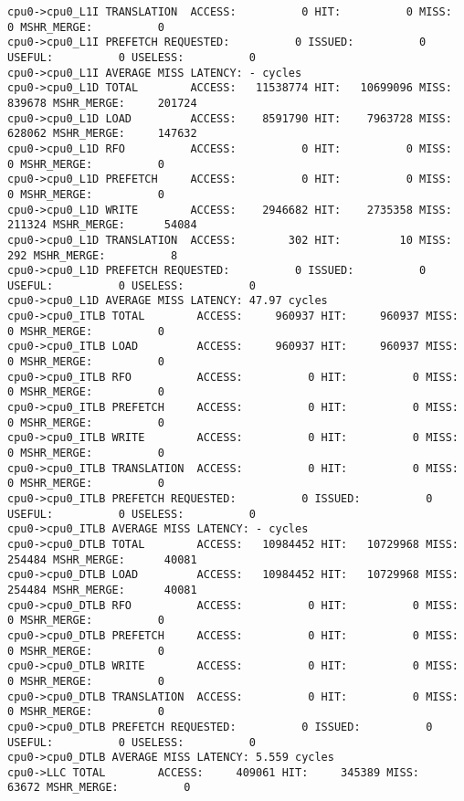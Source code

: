 \documentclass[17pt]{article}
\begin{document}
\begin{LTR}
\begin{lstlisting}[basicstyle=\tiny\ttfamily]
cpu0->cpu0_L1I TRANSLATION  ACCESS:          0 HIT:          0 MISS:          0 MSHR_MERGE:          0
cpu0->cpu0_L1I PREFETCH REQUESTED:          0 ISSUED:          0 USEFUL:          0 USELESS:          0
cpu0->cpu0_L1I AVERAGE MISS LATENCY: - cycles
cpu0->cpu0_L1D TOTAL        ACCESS:   11538774 HIT:   10699096 MISS:     839678 MSHR_MERGE:     201724
cpu0->cpu0_L1D LOAD         ACCESS:    8591790 HIT:    7963728 MISS:     628062 MSHR_MERGE:     147632
cpu0->cpu0_L1D RFO          ACCESS:          0 HIT:          0 MISS:          0 MSHR_MERGE:          0
cpu0->cpu0_L1D PREFETCH     ACCESS:          0 HIT:          0 MISS:          0 MSHR_MERGE:          0
cpu0->cpu0_L1D WRITE        ACCESS:    2946682 HIT:    2735358 MISS:     211324 MSHR_MERGE:      54084
cpu0->cpu0_L1D TRANSLATION  ACCESS:        302 HIT:         10 MISS:        292 MSHR_MERGE:          8
cpu0->cpu0_L1D PREFETCH REQUESTED:          0 ISSUED:          0 USEFUL:          0 USELESS:          0
cpu0->cpu0_L1D AVERAGE MISS LATENCY: 47.97 cycles
cpu0->cpu0_ITLB TOTAL        ACCESS:     960937 HIT:     960937 MISS:          0 MSHR_MERGE:          0
cpu0->cpu0_ITLB LOAD         ACCESS:     960937 HIT:     960937 MISS:          0 MSHR_MERGE:          0
cpu0->cpu0_ITLB RFO          ACCESS:          0 HIT:          0 MISS:          0 MSHR_MERGE:          0
cpu0->cpu0_ITLB PREFETCH     ACCESS:          0 HIT:          0 MISS:          0 MSHR_MERGE:          0
cpu0->cpu0_ITLB WRITE        ACCESS:          0 HIT:          0 MISS:          0 MSHR_MERGE:          0
cpu0->cpu0_ITLB TRANSLATION  ACCESS:          0 HIT:          0 MISS:          0 MSHR_MERGE:          0
cpu0->cpu0_ITLB PREFETCH REQUESTED:          0 ISSUED:          0 USEFUL:          0 USELESS:          0
cpu0->cpu0_ITLB AVERAGE MISS LATENCY: - cycles
cpu0->cpu0_DTLB TOTAL        ACCESS:   10984452 HIT:   10729968 MISS:     254484 MSHR_MERGE:      40081
cpu0->cpu0_DTLB LOAD         ACCESS:   10984452 HIT:   10729968 MISS:     254484 MSHR_MERGE:      40081
cpu0->cpu0_DTLB RFO          ACCESS:          0 HIT:          0 MISS:          0 MSHR_MERGE:          0
cpu0->cpu0_DTLB PREFETCH     ACCESS:          0 HIT:          0 MISS:          0 MSHR_MERGE:          0
cpu0->cpu0_DTLB WRITE        ACCESS:          0 HIT:          0 MISS:          0 MSHR_MERGE:          0
cpu0->cpu0_DTLB TRANSLATION  ACCESS:          0 HIT:          0 MISS:          0 MSHR_MERGE:          0
cpu0->cpu0_DTLB PREFETCH REQUESTED:          0 ISSUED:          0 USEFUL:          0 USELESS:          0
cpu0->cpu0_DTLB AVERAGE MISS LATENCY: 5.559 cycles
cpu0->LLC TOTAL        ACCESS:     409061 HIT:     345389 MISS:      63672 MSHR_MERGE:          0

\end{lstlisting}
\end{LTR}
\end{document}
